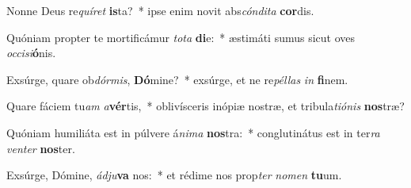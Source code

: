 \item Nonne Deus re\textit{quí}\textit{ret} \textbf{is}ta?~* ipse enim novit abs\textit{cón}\textit{di}\textit{ta} \textbf{cor}dis.
\item Quóniam propter te mortificámur \textit{to}\textit{ta} \textbf{di}e:~* æstimáti sumus sicut oves \textit{oc}\textit{ci}\textit{si}\textbf{ó}nis.
\item Exsúrge, quare ob\textit{dór}\textit{mis}, \textbf{Dó}mine?~* exsúrge, et ne re\textit{pél}\textit{las} \textit{in} \textbf{fi}nem.
\item Quare fáciem tu\textit{am} \textit{a}\textbf{vér}tis,~* oblivísceris inópiæ nostræ, et tribula\textit{ti}\textit{ó}\textit{nis} \textbf{nos}træ?
\item Quóniam humiliáta est in púlvere á\textit{ni}\textit{ma} \textbf{nos}tra:~* conglutinátus est in ter\textit{ra} \textit{ven}\textit{ter} \textbf{nos}ter.
\item Exsúrge, Dómine, \textit{ád}\textit{ju}\textbf{va} nos:~* et rédime nos prop\textit{ter} \textit{no}\textit{men} \textbf{tu}um.

